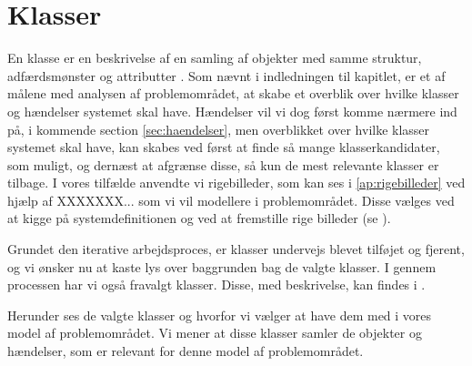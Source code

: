 \section{Klasser}
\label{sec:klasser}

En klasse er en beskrivelse af en samling af objekter med samme struktur, adfærdsmønster og attributter \cite[s. ~51]{ooad}. Som nævnt i indledningen til kapitlet, er et af målene med analysen af problemområdet, at skabe et overblik over hvilke klasser og hændelser systemet skal have. Hændelser vil vi dog først komme nærmere ind på, i kommende section \ref{sec:haendelser}, men overblikket over hvilke klasser systemet skal have, kan skabes ved først at finde så mange klasserkandidater, som muligt, og dernæst at afgrænse disse, så kun de mest relevante klasser er tilbage. I vores tilfælde anvendte vi rigebilleder, som kan ses i \ref{ap:rigebilleder} ved hjælp af XXXXXXX... som vi vil modellere i problemområdet. Disse vælges
ved at kigge på systemdefinitionen og ved at fremstille rige billeder (se ).

Grundet den iterative arbejdsproces, er klasser undervejs blevet tilføjet og fjerent, og vi ønsker nu at kaste lys over baggrunden bag de valgte klasser. I gennem processen har vi også fravalgt klasser. Disse, med beskrivelse, kan findes i .

Herunder ses de valgte klasser og hvorfor vi vælger at have dem med i vores model af problemområdet.
Vi mener at disse klasser samler de objekter og hændelser, som er relevant for denne model af problemområdet.


